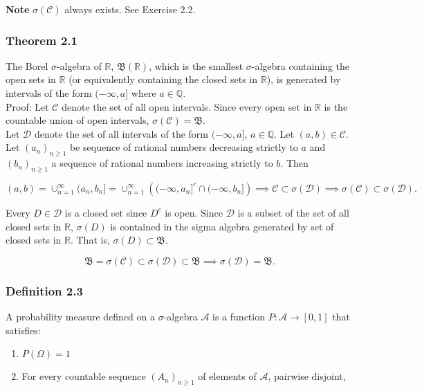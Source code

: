 \documentclass{article}
\begin{document}
{\bf Note} $\sigma(\mathcal{C})$ always exists. See Exercise 2.2. \\

\subsubsection*{Theorem 2.1} The Borel $\sigma$-algebra of $\mathbb{R}$, $\mathfrak{B}(\mathbb{R})$, which is the smallest $\sigma$-algebra containing the open sets in $\mathbb{R}$ (or equivalently containing the closed sets in $\mathbb{R}$), is generated by intervals of the form $(-\infty, a]$ where $a \in \mathbb{Q}$. \\

Proof: Let $\mathcal{C}$ denote the set of all open intervals. Since every open set in $\mathbb{R}$ is the countable union of open intervals, $\sigma(\mathcal{C}) = \mathfrak{B}$. \\

Let $\mathcal{D}$ denote the set of all intervals of the form $(-\infty, a]$, $a \in \mathbb{Q}$. Let $(a,b) \in \mathcal{C}$. Let $(a_n)_{n\geq 1}$ be sequence of rational numbers decreasing strictly to $a$ and $(b_n)_{n\geq 1}$ a sequence of rational numbers increasing strictly to $b$. Then

$$(a,b) = \cup_{n=1}^\infty (a_n, b_n]
= \cup_{n=1}^\infty \left( (-\infty, a_n]^c \cap (-\infty, b_n] \right) \implies \mathcal{C} \subset \sigma(\mathcal{D}) \implies \sigma(\mathcal{C}) \subset \sigma(\mathcal{D}). $$

Every $D \in \mathcal{D}$ is a closed set since $D^c$ is open. Since $\mathcal{D}$ is a subset of the set of all closed sets in $\mathbb{R}$, $\sigma(D)$ is contained in the sigma algebra generated by set of closed sets in $\mathbb{R}$. That is, $\sigma(D) \subset \mathfrak{B}$.

$$\mathfrak{B} = \sigma(\mathcal{C}) \subset \sigma(\mathcal{D}) \subset \mathfrak{B} \implies \sigma(\mathcal{D}) = \mathfrak{B}.$$

\subsubsection*{Definition 2.3} A probability measure defined on a $\sigma$-algebra $\mathcal{A}$ is a function $P: \mathcal{A} \rightarrow [0,1]$ that satisfies:

\begin{enumerate}
\item $P(\Omega) = 1$
\item For every countable sequence $(A_n)_{n\geq 1}$ of elements of $\mathcal{A}$, pairwise disjoint, 
\end{enumerate}
\end{document}
